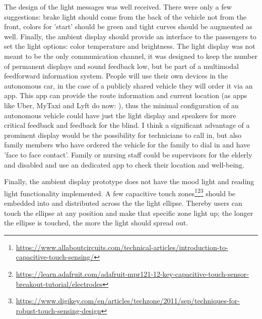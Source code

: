 The design of the light messages was well received. There were only a few suggestions: brake light should come from the back of the vehicle not from the front, colors for 'start' should be green and tight curves should be augmented as well. Finally, the ambient display should provide an interface to the passengers to set the light options: color temperature and brightness. 
The light display was not meant to be the only communication channel, it was designed to keep the number of permanent displays and sound feedback low, but be part of a multimodal feedforward information system. People will use their own devices in the autonomous car, in the case of a publicly shared vehicle they will order it via an app. This app can provide the route information and current location (as apps like Uber, MyTaxi and Lyft do now: \emph{}), thus the minimal configuration of an autonomous vehicle could have just the light display and speakers for more critical feedback and feedback for the blind. I think a significant advantage of a prominent display would be the possibility for technicians to call in, but also family members who have ordered the vehicle for the family to dial in and have 'face to face contact'. Family or nursing staff could be supervisors for the elderly and disabled and use an dedicated app to check their location and well-being.

Finally, the ambient display prototype does not have the mood light and reading light functionality implemented.  A few capacitive touch zones\footnote{\url{https://www.allaboutcircuits.com/technical-articles/introduction-to-capacitive-touch-sensing/}}\fnsep\footnote{\url{https://learn.adafruit.com/adafruit-mpr121-12-key-capacitive-touch-sensor-breakout-tutorial/electrodes}}\fnsep\footnote{\url{https://www.digikey.com/en/articles/techzone/2011/sep/techniques-for-robust-touch-sensing-design}} should be embedded into and distributed across the the light ellipse. Thereby users can touch the ellipse at any position and make that specific zone light up; the longer the ellipse is touched, the more the light should spread out. 